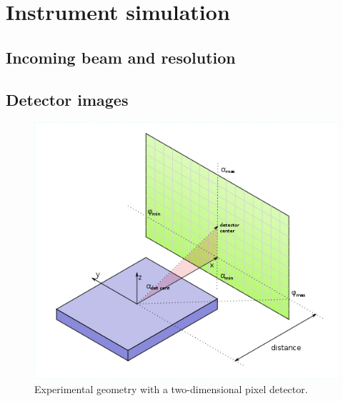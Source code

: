 
\chapter{Instrument simulation}  \label{SInstr}

\section{Incoming beam and resolution}\label{SBeam}

\MissingSection

\section{Detector images}\label{SdetImg}

\def\tc{\text{c}}

\begin{figure}[t]
\begin{center}
\includegraphics[width=.5\textwidth]{fig/drawing/experimental_geometry.png}
\end{center}
\caption{Experimental geometry with a two-dimensional pixel detector.}
\label{FexpGeom}
\end{figure}

